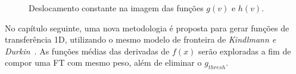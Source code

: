 \begin{figure}[h]
	\centering
	\caption{Deslocamento constante na imagem das funções $ g(v) $ e $ h(v) $.}
	\label{fig:g_shift}
\end{figure}

	No capítulo seguinte, uma nova metodologia é proposta para gerar funções de transferência 1D, utilizando o mesmo modelo de fronteira de \textit{Kindlmann e Durkin}~\cite{gordon}. As funções médias das derivadas de $ f(x) $ serão exploradas a fim de compor uma FT com mesmo peso, além de eliminar o $ g_{thresh} $.